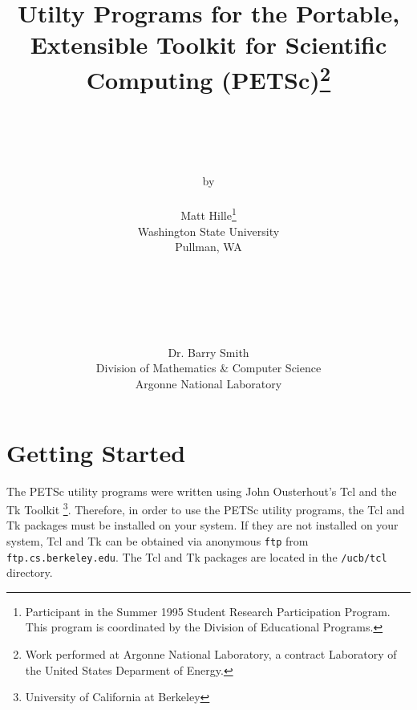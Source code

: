
\def\note{\medskip \noindent Note:\begin{em}}
\def\endnote{\end{em} \medskip}






\begin{titlepage}

\title{Utilty Programs for the Portable, Extensible Toolkit for Scientific
	Computing (PETSc)\thanks{Work performed at Argonne National
	Laboratory, a contract Laboratory of the United States Deparment of
	Energy.}}

\author{\\ \\ \\ \\ by \\ \\ Matt Hille\thanks{Participant in the Summer 1995 Student
   Research Participation Program.  This program is coordinated by the 
   Division of Educational Programs.} \\ Washington State University \\ 
   Pullman, WA \\ \\ \\
\and
   \\ \\ \\ Dr. Barry Smith \\ Division of Mathematics \& Computer Science \\
   Argonne National Laboratory}

\end{titlepage}
\maketitle

\newpage 

\tableofcontents

\newpage
\section{Getting Started}

The PETSc utility programs were written using John Ousterhout's Tcl and the Tk Toolkit \footnote{University of California at Berkeley}.  Therefore, in order to use the PETSc utility programs, the Tcl and Tk packages must be installed on your system.  If they are not installed on your system, Tcl and Tk can be obtained via anonymous {\tt ftp} from {\tt ftp.cs.berkeley.edu}.  The Tcl and Tk packages are located in the {\tt /ucb/tcl} directory.   

